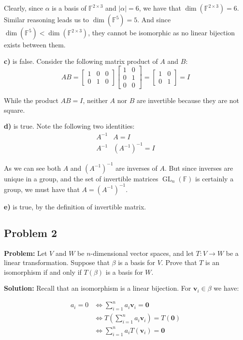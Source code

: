 \documentclass{article}
\renewcommand\vec{\mathbf}
\begin{document}
Clearly, since $\alpha$ is a basis of $\mathbb F^{2\times 3}$ and $|\alpha|=6$, we have that $\dim(\mathbb F^{2\times 3})=6$. Similar reasoning leads us to $\dim(\mathbb F^5)=5$. And since $\dim(\mathbb F^5)<\dim(\mathbb F^{2\times 3})$, they cannot be isomorphic as no linear bijection exists between them.
\medskip

\textbf{c)} is false. Consider the following matrix product of $A$ and $B$:
$$AB=\begin{bmatrix}
  1&0&0\\0&1&0
\end{bmatrix}\begin{bmatrix}
  1&0\\0&1\\0&0
\end{bmatrix}=\begin{bmatrix}
  1&0\\0&1
\end{bmatrix}=I$$

While the product $AB=I$, neither $A$ nor $B$ are invertible because they are not square.
\medskip

\textbf{d)} is true. Note the following two identities:
\begin{align*}
  A^{-1}&A=I\tag{def. of inverse}\\
  A^{-1}&(A^{-1})^{-1}=I\tag{def. of inverse}
\end{align*}

As we can see both $A$ and $(A^{-1})^{-1}$ are inverses of $A$. But since inverses are unique in a group, and the set of invertible matrices $\operatorname{GL}_n(\mathbb F)$ is certainly a group, we must have that $A=(A^{-1})^{-1}$.
\medskip

\textbf{e)} is true, by the definition of invertible matrix.

\bigskip

\subsection*{Problem 2}
\noindent\textbf{Problem:} Let $V$ and $W$ be $n$-dimensional vector spaces, and let $T:V\to W$ be a linear transformation. Suppose that $\beta$ is a basis for $V$. Prove that $T$ is an isomorphism if and only if $T(\beta)$ is a basis for $W$.
\bigskip

\noindent\textbf{Solution:} Recall that an isomorphism is a linear bijection. For $\vec v_i\in\beta$ we have:

\begin{align*}
  a_i=0&\iff\sum_{i=1}^n a_i\vec v_i=\vec 0\tag{$\beta$ is a basis}\\
  &\iff T\left(\sum_{i=1}^n a_i\vec v_i\right)=T(\vec 0)\tag{$T$ is bijective}\\
  &\iff \sum_{i=1}^n a_iT\left(\vec v_i\right)=\vec 0\tag{$T$ is linear}
\end{align*}
\end{document}
